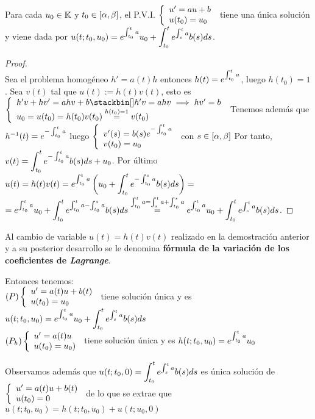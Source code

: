 \begin{teor} Para cada $u_0\in\K$ y $t_0\in\alphabeta$, el P.V.I. $\doubleleft{u'=au+b}{u(t_0)=u_0}$ tiene una única solución y viene dada por $u(t;t_0,u_0)=e^{\inte{t}{t_0}a}u_0+\integral{t}{t_0} e^{\inte{t}{s}a}b(s)ds$.\\
\begin{proof}\ \\
Sea el problema homogéneo $h'=a(t)h$ entonces $h(t)=e^{\inte{t}{t_0}a}$, luego $h(t_0)=1$.
Sea $v(t)$ tal que $u(t):=h(t)v(t)$, esto es $\doubleleft{h'v+hv'=ahv+b\ximplies{h'v=ahv}{}hv'=b}{u_0=u(t_0)=h(t_0)v(t_0)\overset{h(t_0)=1}=v(t_0)}$ Tenemos además que $h^{-1}(t)=e^{-\inte{t}{t_0}a}$ luego $\doubleleft{v'(s)=b(s)e^{-\inte{t}{t_0}a}}{v(t_0)=u_0}$ con $s\in\alphabeta$ Por tanto,\\
$v(t)=\integral{t}{t_0}e^{-\inte{t}{t_0}a}b(s)ds+u_0$. Por último $u(t)=h(t)v(t)=e^{\inte{t}{t_0}a}\left(u_0+\integral{t}{t_0}e^{-\inte{s}{t_0}a}b(s)ds  \right)=$\\
$=e^{\inte{t}{t_0}a}u_0+\integral{t}{t_0}e^{\inte{t}{t_0}a-\inte{s}{t_0}a}b(s)ds\overset{\inte{t}{t_0}a=\inte{t}{s}a+\inte{s}{t_0}a}=e^{\inte{t}{t_0}a}u_0+\integral{t}{t_0}e^{\inte{t}{s}a}b(s)ds$.
\end{proof}
\end{teor}

\begin{defi} Al cambio de variable $u(t)=h(t)v(t)$ realizado en la demostración anterior y a su posterior desarrollo se le denomina \textbf{fórmula de la variación de los coeficientes de \textit{Lagrange}}.
\end{defi}

\begin{corolario} Entonces tenemos:\\
$(P)\doubleleft{u'=a(t)u+b(t)}{u(t_0)=u_0}$ tiene solución única y es $u(t;t_0,u_0)=e^{\inte{t}{t_0}a}u_0+\integral{t}{t_0}e^{\inte{t}{s}a}b(s)ds$\\
$(P_h)\doubleleft{u'=a(t)u}{u(t_0)=u_0)}$ tiene solución única y es $h(t;t_0,u_0)=e^{\inte{t}{t_0}a}u_0$

Observamos además que $u(t;t_0,0)=\integral{t}{t_0}e^{\inte{t}{s}a}b(s)ds$ es única solución de\\
$\doubleleft{u'=a(t)u+b(t)}{u(t_0)=0}$ de lo que se extrae que $u(t;t_0,u_0)=h(t;t_0,u_0)+u(t;u_0,0)$
\end{corolario}

